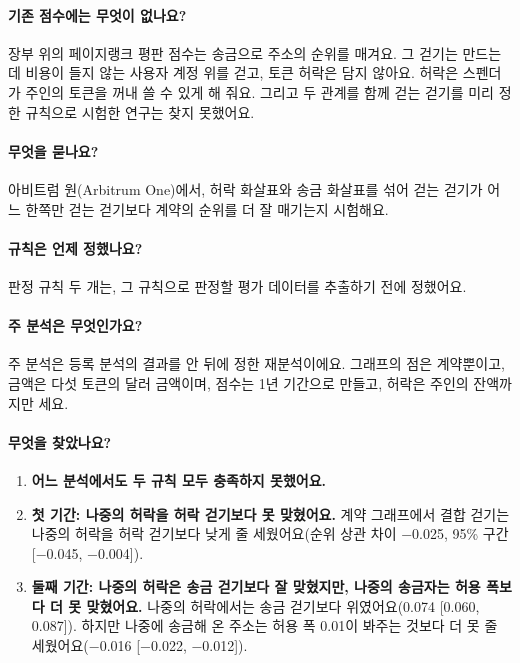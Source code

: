 \documentclass[11pt]{article}
\begin{document}
\paragraph{기존 점수에는 무엇이 없나요?}
장부 위의 페이지랭크 평판 점수는 송금으로 주소의 순위를 매겨요. 그 걷기는 만드는 데 비용이 들지 않는 사용자 계정 위를 걷고, 토큰 허락은 담지 않아요. 허락은 스펜더가 주인의 토큰을 꺼내 쓸 수 있게 해 줘요. 그리고 두 관계를 함께 걷는 걷기를 미리 정한 규칙으로 시험한 연구는 찾지 못했어요.

\paragraph{무엇을 묻나요?}
아비트럼 원(Arbitrum One)에서, 허락 화살표와 송금 화살표를 섞어 걷는 걷기가 어느 한쪽만 걷는 걷기보다 계약의 순위를 더 잘 매기는지 시험해요.

\paragraph{규칙은 언제 정했나요?}
판정 규칙 두 개는, 그 규칙으로 판정할 평가 데이터를 추출하기 전에 정했어요.

\paragraph{주 분석은 무엇인가요?}
주 분석은 등록 분석의 결과를 안 뒤에 정한 재분석이에요. 그래프의 점은 계약뿐이고, 금액은 다섯 토큰의 달러 금액이며, 점수는 1년 기간으로 만들고, 허락은 주인의 잔액까지만 세요.

\paragraph{무엇을 찾았나요?}
\begin{enumerate}
\item \textbf{어느 분석에서도 두 규칙 모두 충족하지 못했어요.}
\item \textbf{첫 기간: 나중의 허락을 허락 걷기보다 못 맞혔어요.} 계약 그래프에서 결합 걷기는 나중의 허락을 허락 걷기보다 낮게 줄 세웠어요(순위 상관 차이 −0.025, 95\% 구간 [−0.045, −0.004]).
\item \textbf{둘째 기간: 나중의 허락은 송금 걷기보다 잘 맞혔지만, 나중의 송금자는 허용 폭보다 더 못 맞혔어요.} 나중의 허락에서는 송금 걷기보다 위였어요(0.074 [0.060, 0.087]). 하지만 나중에 송금해 온 주소는 허용 폭 0.01이 봐주는 것보다 더 못 줄 세웠어요(−0.016 [−0.022, −0.012]).
\end{enumerate}
\end{document}
